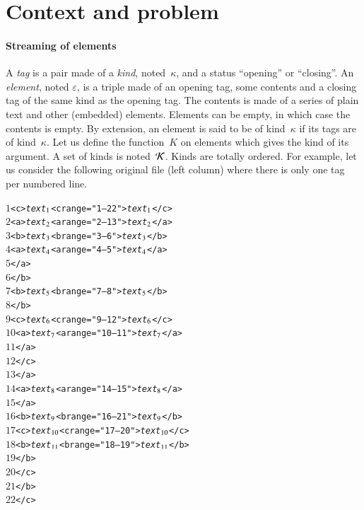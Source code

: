 
\section{Context and problem}
\label{problem}

\paragraph{Streaming of \XML elements}

A \emph{tag} is a pair made of a \emph{kind}, noted~\(\kappa\), and a
status ``opening'' or ``closing''. An \emph{element}, noted
\(\varepsilon\), is a triple made of an opening tag, some contents and
a closing tag of the same kind as the opening tag. The contents is
made of a series of plain text and other (embedded) elements. Elements
can be empty, in which case the contents is empty. By extension, an
element is said to be of kind~\(\kappa\) if its tags are of
kind~\(\kappa\). Let us define the function~\(K\) on elements which
gives the kind of its argument. A set of kinds is noted~\(\cal
K\). Kinds are totally ordered. For example, let us consider the
following original \XML file (left column) where there is only one tag
per numbered line.
{\small\begin{alltt}
 \(1\) <c> \emph{text\(\sb{1}\)}                          <c range="1--22"> \emph{text\(\sb{1}\)} </c>
 \(2\)   <a> \emph{text\(\sb{2}\)}                        <a range="2--13"> \emph{text\(\sb{2}\)} </a>
 \(3\)     <b> \emph{text\(\sb{3}\)}                      <b range="3--6"> \emph{text\(\sb{3}\)} </b>
 \(4\)       <a> \emph{text\(\sb{4}\)}                    <a range="4--5"> \emph{text\(\sb{4}\)} </a>
 \(5\)       </a>
 \(6\)     </b>
 \(7\)     <b> \emph{text\(\sb{5}\)}                      <b range="7--8"> \emph{text\(\sb{5}\)} </b>
 \(8\)     </b>
 \(9\)     <c> \emph{text\(\sb{6}\)}                      <c range="9--12"> \emph{text\(\sb{6}\)} </c>
\(10\)       <a> \emph{text\(\sb{7}\)}                    <a range="10--11"> \emph{text\(\sb{7}\)} </a>
\(11\)       </a>
\(12\)     </c>
\(13\)   </a>
\(14\)   <a> \emph{text\(\sb{8}\)}                        <a range="14--15"> \emph{text\(\sb{8}\)} </a>
\(15\)   </a>
\(16\)   <b> \emph{text\(\sb{9}\)}                        <b range="16--21"> \emph{text\(\sb{9}\)} </b>
\(17\)     <c> \emph{text\(\sb{10}\)}                     <c range="17--20"> \emph{text\(\sb{10}\)} </c>
\(18\)       <b> \emph{text\(\sb{11}\)}                   <b range="18--19"> \emph{text\(\sb{11}\)} </b>
\(19\)       </b>
\(20\)     </c>
\(21\)   </b>
\(22\) </c>
\end{alltt}}
